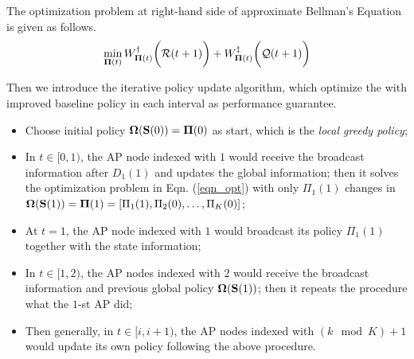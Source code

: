 The optimization problem at right-hand side of approximate Bellman's Equation is given as follows.
\begin{align}
    \min_{\boldsymbol{\Pi}(t)} W^{\dagger}_{\boldsymbol{\Pi}(t)}\bigg(\mathcal{R}(t+1)\bigg) + W^{\ddagger}_{\boldsymbol{\Pi}(t)}\bigg(\mathcal{Q}(t+1)\bigg)
    \label{eqn_opt}
\end{align}

Then we introduce the iterative policy update algorithm, which optimize the 
with improved baseline policy in each interval as performance guarantee.
\begin{itemize}
    \item Choose initial policy $\boldsymbol{\Omega}(\mathbf{S}(0)) = \boldsymbol{\Pi}(0)$ as start, which is the \emph{local greedy policy};
    \item In $t\in[0, 1)$, the AP node indexed with $1$ would receive the broadcast information after $D_1(1)$ and updates the global information; then it solves the optimization problem in Eqn. (\ref{eqn_opt}) with only $\Pi_{1}(1)$ changes in $\boldsymbol{\Omega}(\mathbf{S}(1)) = \boldsymbol{\Pi}(1) = [\Pi_{1}(1), \Pi_{2}(0), \dots, \Pi_{K}(0)]$;
    \item At $t=1$, the AP node indexed with $1$ would broadcast its policy $\Pi_{1}(1)$ together with the state information;
    \item In $t\in[1, 2)$, the AP nodes indexed with $2$ would receive the broadcast information and previous global policy $\boldsymbol{\Omega}(\mathbf{S}(1))$; then it repeats the procedure what the $1$-st AP did;
    \item Then generally, in $t\in[{i}, {i+1})$, the AP nodes indexed with $(k \mod K)+1$ would update its own policy following the above procedure.
\end{itemize}


